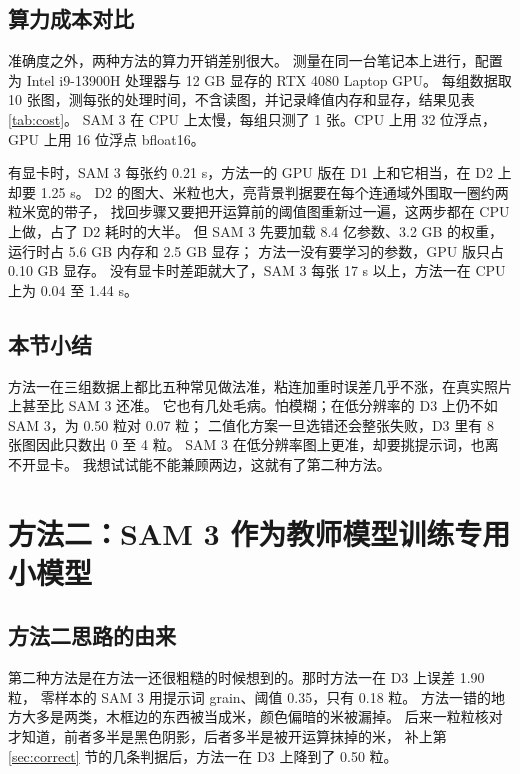 \subsection{算力成本对比}
\label{sec:cost}

准确度之外，两种方法的算力开销差别很大。
测量在同一台笔记本上进行，配置为 Intel i9-13900H 处理器与 12 GB 显存的 RTX 4080 Laptop GPU。
每组数据取 10 张图，测每张的处理时间，不含读图，并记录峰值内存和显存，结果见表 \ref{tab:cost}。
SAM 3 在 CPU 上太慢，每组只测了 1 张。CPU 上用 32 位浮点，GPU 上用 16 位浮点 bfloat16。


\begin{ctable}
  \centering
  \caption{单张图的处理时间和资源占用，显存为分配峰值，SAM 3 在 CPU 上每组只测 1 张。
  每行加粗的是最省的一项。}
  \label{tab:cost}
  \tabfit{}
\end{ctable}

有显卡时，SAM 3 每张约 0.21 s，方法一的 GPU 版在 D1 上和它相当，在 D2 上却要 1.25 s。
D2 的图大、米粒也大，亮背景判据要在每个连通域外围取一圈约两粒米宽的带子，
找回步骤又要把开运算前的阈值图重新过一遍，这两步都在 CPU 上做，占了 D2 耗时的大半。
但 SAM 3 先要加载 8.4 亿参数、3.2 GB 的权重，运行时占 5.6 GB 内存和 2.5 GB 显存；
方法一没有要学习的参数，GPU 版只占 0.10 GB 显存。
没有显卡时差距就大了，SAM 3 每张 17 s 以上，方法一在 CPU 上为 0.04 至 1.44 s。

\subsection{本节小结}

方法一在三组数据上都比五种常见做法准，粘连加重时误差几乎不涨，在真实照片上甚至比 SAM 3 还准。
它也有几处毛病。怕模糊；在低分辨率的 D3 上仍不如 SAM 3，为 0.50 粒对 0.07 粒；
二值化方案一旦选错还会整张失败，D3 里有 8 张图因此只数出 0 至 4 粒。
SAM 3 在低分辨率图上更准，却要挑提示词，也离不开显卡。
我想试试能不能兼顾两边，这就有了第二种方法。

\section{方法二：SAM 3 作为教师模型训练专用小模型}
\label{sec:student}

\subsection{方法二思路的由来}

第二种方法是在方法一还很粗糙的时候想到的。那时方法一在 D3 上误差 1.90 粒，
零样本的 SAM 3 用提示词 grain、阈值 0.35，只有 0.18 粒。
方法一错的地方大多是两类，木框边的东西被当成米，颜色偏暗的米被漏掉。
后来一粒粒核对才知道，前者多半是黑色阴影，后者多半是被开运算抹掉的米，
补上第 \ref{sec:correct} 节的几条判据后，方法一在 D3 上降到了 0.50 粒。

